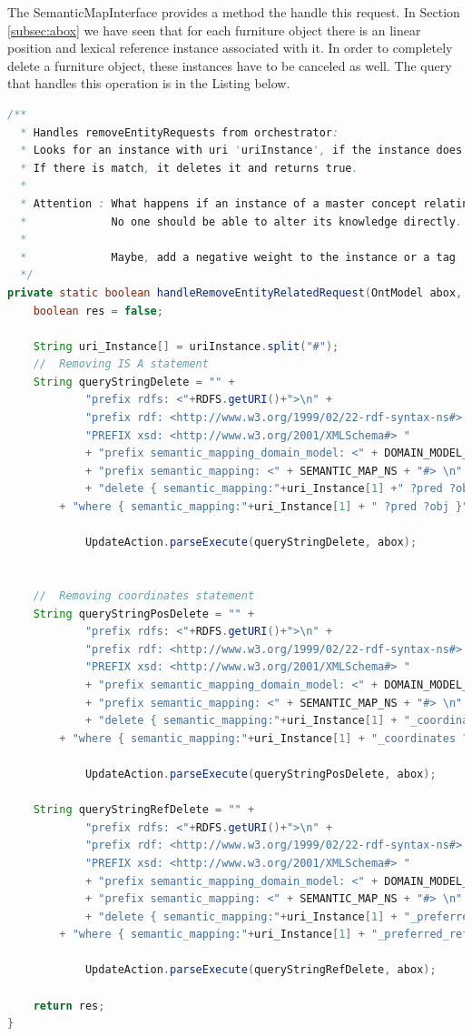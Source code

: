 The SemanticMapInterface provides a method the handle this request. In Section \ref{subsec:abox} we have seen that for each furniture object there is an linear position and lexical reference instance associated with it. In order to completely delete a furniture object, these instances have to be canceled as well. The query that handles this operation is in the Listing below.
\begin{lstlisting}[language=Java]
/**
  * Handles removeEntityRequests from orchestrator:
  *	Looks for an instance with uri 'uriInstance', if the instance does not exist returns false.
  * If there is match, it deletes it and returns true. 
  * 
  * Attention : What happens if an instance of a master concept relating two entities is deleted?
  * 			No one should be able to alter its knowledge directly.
  *	
  * 			Maybe, add a negative weight to the instance or a tag
  */
private static boolean handleRemoveEntityRelatedRequest(OntModel abox, String uriInstance) {
	boolean res = false;

	String uri_Instance[] = uriInstance.split("#");
	//  Removing IS A statement
	String queryStringDelete = "" + 
			"prefix rdfs: <"+RDFS.getURI()+">\n" +
			"prefix rdf: <http://www.w3.org/1999/02/22-rdf-syntax-ns#> \n"+
			"PREFIX xsd: <http://www.w3.org/2001/XMLSchema#> "				
			+ "prefix semantic_mapping_domain_model: <" + DOMAIN_MODEL_NS + "#> \n"
			+ "prefix semantic_mapping: <" + SEMANTIC_MAP_NS + "#> \n"
			+ "delete { semantic_mapping:"+uri_Instance[1] +" ?pred ?obj }  "
        + "where { semantic_mapping:"+uri_Instance[1] + " ?pred ?obj }";
			
			UpdateAction.parseExecute(queryStringDelete, abox);
	

	//  Removing coordinates statement
	String queryStringPosDelete = "" + 
			"prefix rdfs: <"+RDFS.getURI()+">\n" +
			"prefix rdf: <http://www.w3.org/1999/02/22-rdf-syntax-ns#> \n"+
			"PREFIX xsd: <http://www.w3.org/2001/XMLSchema#> "				
			+ "prefix semantic_mapping_domain_model: <" + DOMAIN_MODEL_NS + "#> \n"
			+ "prefix semantic_mapping: <" + SEMANTIC_MAP_NS + "#> \n"
			+ "delete { semantic_mapping:"+uri_Instance[1] + "_coordinates ?pred ?obj }  "
        + "where { semantic_mapping:"+uri_Instance[1] + "_coordinates ?pred ?obj }";
			
			UpdateAction.parseExecute(queryStringPosDelete, abox);
	
	String queryStringRefDelete = "" + 
			"prefix rdfs: <"+RDFS.getURI()+">\n" +
			"prefix rdf: <http://www.w3.org/1999/02/22-rdf-syntax-ns#> \n"+
			"PREFIX xsd: <http://www.w3.org/2001/XMLSchema#> "				
			+ "prefix semantic_mapping_domain_model: <" + DOMAIN_MODEL_NS + "#> \n"
			+ "prefix semantic_mapping: <" + SEMANTIC_MAP_NS + "#> \n"
			+ "delete { semantic_mapping:"+uri_Instance[1] + "_preferred_reference ?pred ?obj }  "
        + "where { semantic_mapping:"+uri_Instance[1] + "_preferred_reference ?pred ?obj }";
			
			UpdateAction.parseExecute(queryStringRefDelete, abox);
			
	return res;
}
\end{lstlisting}
\label{lst:delete}

